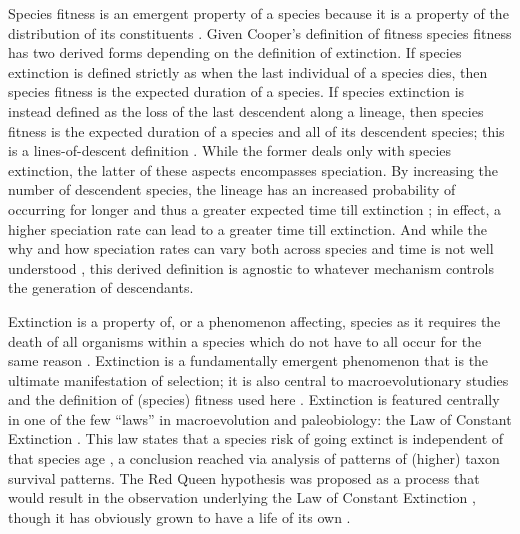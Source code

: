 Species fitness is an emergent property of a species because it is a property of the distribution of its constituents \citep{Jablonski2007}. Given Cooper's definition of fitness \citep{Cooper1984} species fitness has two derived forms depending on the definition of extinction. If species extinction is defined strictly as when the last individual of a species dies, then species fitness is the expected duration of a species. If species extinction is instead defined as the loss of the last descendent along a lineage, then species fitness is the expected duration of a species and all of its descendent species; this is a lines-of-descent definition \citep{Cooper1984}. While the former deals only with species extinction, the latter of these aspects encompasses speciation. By increasing the number of descendent species, the lineage has an increased probability of occurring for longer and thus a greater expected time till extinction \citep{Cooper1984}; in effect, a higher speciation rate can lead to a greater time till extinction. And while the why and how speciation rates can vary both across species and time is not well understood \citep{Rabosky2015c,Rabosky2013e,Coyne2004}, this derived definition is agnostic to whatever mechanism controls the generation of descendants. 

Extinction is a property of, or a phenomenon affecting, species as it requires the death of all organisms within a species which do not have to all occur for the same reason \citep{Simpson2016a}. Extinction is a fundamentally emergent phenomenon that is the ultimate manifestation of selection; it is also central to macroevolutionary studies and the definition of (species) fitness used here \citep{Cooper1984}. Extinction is featured centrally in one of the few ``laws'' in macroevolution and paleobiology: the Law of Constant Extinction \citep{VanValen1973,Liow2011a}. This law states that a species risk of going extinct is independent of that species age \citep{VanValen1973,Liow2011a}, a conclusion reached via analysis of patterns of (higher) taxon survival patterns. The Red Queen hypothesis was proposed as a process that would result in the observation underlying the Law of Constant Extinction \citep{VanValen1973}, though it has obviously grown to have a life of its own \citep{Liow2011a}.

